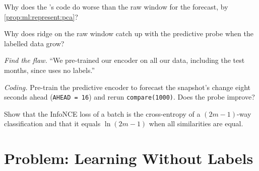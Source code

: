 \begin{exercise}[$\star\star$]\label{exo:ml:representation-learning:4}
Why does the 's code do worse than the raw window for the forecast, by \cref{prop:ml:represent:pca}?
\end{exercise}

\begin{exercise}[$\star\star$]\label{exo:ml:representation-learning:5}
Why does ridge on the raw window catch up with the predictive probe when the labelled data grow?
\end{exercise}

\begin{exercise}[$\star\star$]\label{exo:ml:representation-learning:6}
\emph{Find the flaw.} ``We pre-trained our encoder on all our data, including the test months, since  uses no
labels.''
\end{exercise}

\begin{exercise}[$\star\star\star$]\label{exo:ml:representation-learning:7}
\emph{Coding.} Pre-train the predictive encoder to forecast the snapshot's change eight seconds ahead (\texttt{AHEAD = 16})
and rerun \texttt{compare(1000)}. Does the probe improve?
\end{exercise}

\begin{exercise}[$\star\star\star$]\label{exo:ml:representation-learning:8}
Show that the InfoNCE loss of a batch is the cross-entropy of a $(2m - 1)$-way classification and that it equals
$\ln(2m - 1)$ when all similarities are equal.
\end{exercise}

\section{Problem: Learning Without Labels}

